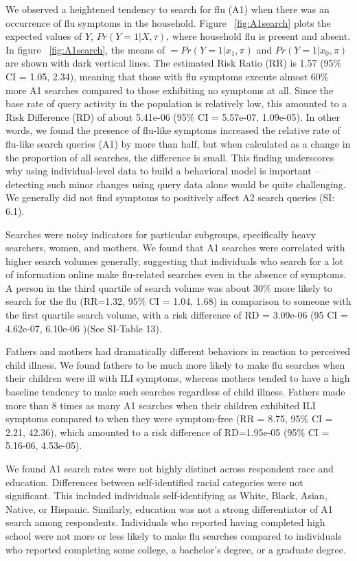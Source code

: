 \documentclass[fleqn,10pt]{wlscirep}
\begin{document}
We observed a heightened tendency to search for flu (A1) when there was an occurrence of flu symptoms in the household. Figure ~\ref{fig:A1search} plots the expected values of $Y$, $Pr(Y=1|X, \tau)$, where household flu is present and absent. In figure ~\ref{fig:A1search}, the means of $ = Pr(Y=1|x_1, \pi)$ and $ Pr(Y=1|x_0, \pi) $ are shown with dark vertical lines. The estimated Risk Ratio (RR) is 1.57 (95\% CI = 1.05, 2.34), meaning that those with flu symptoms execute almost 60\% more A1 searches compared to those exhibiting no symptoms at all. Since the base rate of query activity in the population is relatively low, this amounted to a Risk Difference (RD) of about 5.41e-06 (95\% CI = 5.57e-07, 1.09e-05). In other words, we found the presence of flu-like symptoms increased the relative rate of flu-like search queries (A1) by more than half, but when calculated as a change in the proportion of all searches, the difference is small. This finding underscores why using individual-level data to build a behavioral model is important -- detecting such minor changes using query data alone would be quite challenging. We generally did not find symptoms to positively affect A2 search queries (SI: 6.1).

Searches were noisy indicators for particular subgroups, specifically heavy searchers, women, and mothers. We found that A1 searches were correlated with higher search volumes generally, suggesting that individuals who search for a lot of information online make flu-related searches even in the absence of symptoms. A person in the third quartile of search volume was about 30\% more likely to search for the flu (RR=1.32, 95\% CI = 1.04, 1.68) in comparison to someone with the first quartile search volume, with a risk difference of RD = 3.09e-06 (95 CI = 4.62e-07, 6.10e-06 )(See SI-Table 13).

Fathers and mothers had dramatically different behaviors in reaction to perceived child illness. We found fathers to be much more likely to make flu searches when their children were ill with ILI symptoms, whereas mothers tended to have a high baseline tendency to make such searches regardless of child illness. Fathers made more than 8 times as many A1 searches when their children exhibited ILI symptoms compared to when they were symptom-free (RR = 8.75, 95\% CI = 2.21, 42.36), which amounted to a risk difference of RD=1.95e-05 (95\% CI = 5.16-06, 4.53e-05).

We found A1 search rates were not highly distinct across respondent race and education. Differences between self-identified racial categories were not significant. This included individuals self-identifying as White, Black, Asian, Native, or Hispanic. Similarly, education was not a strong differentiator of A1 search among respondents. Individuals who reported having completed high school were not more or less likely to make flu searches compared to individuals who reported completing some college, a bachelor's degree, or a graduate degree.
\end{document}

